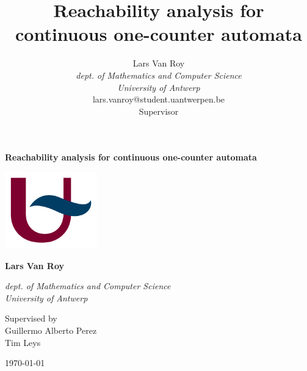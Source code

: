 \documentclass[12pt]{article}
\title{Reachability analysis for continuous one-counter automata}
\author{Lars Van Roy\\
\textit{dept. of Mathematics and Computer Science} \\
\textit{University of Antwerp}\\
lars.vanroy@student.uantwerpen.be\\
\vspace*{10em}
Supervisor}
\begin{document}
	
\begin{titlepage}
	\begin{center}
		\vspace*{1cm}
		
		{\Large\textbf{Reachability analysis for continuous one-counter automata}}
		
		\vspace{1.5cm}
		
		\includegraphics[width=0.3\textwidth]{ua.jpg}
		
		\vspace{1.5cm}
		
		\textbf{Lars Van Roy}
		
		\vspace{0.5cm}
		
		\textit{dept. of Mathematics and Computer Science} \\
		\textit{University of Antwerp}
		
		\vspace{3cm}
		Supervised by \\
		Guillermo Alberto Perez \\
		Tim Leys
		
		\vspace{2cm}
		\monthyeardate\today
	\end{center}
\end{titlepage}
\end{document}

